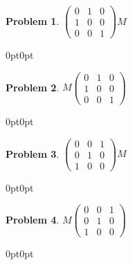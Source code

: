 \documentclass[12pt]{article}
\newenvironment{answer}
    {\begin{adjustwidth}{0pt}{0pt}}
    {\end{adjustwidth}}
\newtheorem{problem}{Problem}
\theoremstyle{remark}  %
\begin{document}
    \setcounter{problem}{0}
    \begin{problem} $
        \begin{pmatrix}
            0 & 1 & 0 \\
            1 & 0 & 0 \\
            0 & 0 & 1
        \end{pmatrix} M
        $
    \end{problem}
    \begin{answer}
    \end{answer}
    \begin{problem} $ M
        \begin{pmatrix}
            0 & 1 & 0 \\
            1 & 0 & 0 \\
            0 & 0 & 1
        \end{pmatrix}
        $
    \end{problem}
    \begin{answer}
        
    \end{answer}
    \begin{problem} $
        \begin{pmatrix}
            0 & 0 & 1 \\
            0 & 1 & 0 \\
            1 & 0 & 0
        \end{pmatrix} M
        $
    \end{problem}
    \begin{answer}

    \end{answer}
    \begin{problem} $ M
        \begin{pmatrix}
            0 & 0 & 1 \\
            0 & 1 & 0 \\
            1 & 0 & 0
        \end{pmatrix}
        $
    \end{problem}
    \begin{answer}
        
    \end{answer}
\end{document}
